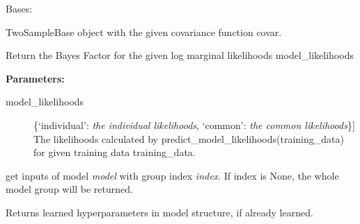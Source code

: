 \documentclass[letterpaper,10pt,english]{sphinxmanual}
\begin{document}

\begin{fulllineitems}
\label{base:gptwosample.twosample.twosample_base.TwoSampleBase}
Bases: 

TwoSampleBase object with the given covariance function covar.

\begin{fulllineitems}
\label{base:gptwosample.twosample.twosample_base.TwoSampleBase.bayes_factor}
Return the Bayes Factor for the given log marginal likelihoods model\_likelihoods

\textbf{Parameters:}
\begin{description}
\item[{model\_likelihoods}] \leavevmode{[}\{`individual': \emph{the individual likelihoods}, `common': \emph{the common likelihoods}\}{]}
The likelihoods calculated by
predict\_model\_likelihoods(training\_data)
for given training data training\_data.

\end{description}

\end{fulllineitems}


\begin{fulllineitems}
\label{base:gptwosample.twosample.twosample_base.TwoSampleBase.get_data}
get inputs of model \emph{model} with group index \emph{index}.
If index is None, the whole model group will be returned.

\end{fulllineitems}


\begin{fulllineitems}
\label{base:gptwosample.twosample.twosample_base.TwoSampleBase.get_learned_hyperparameters}
Returns learned hyperparameters in model structure, if already learned.


\end{fulllineitems}
\end{fulllineitems}
\end{document}
